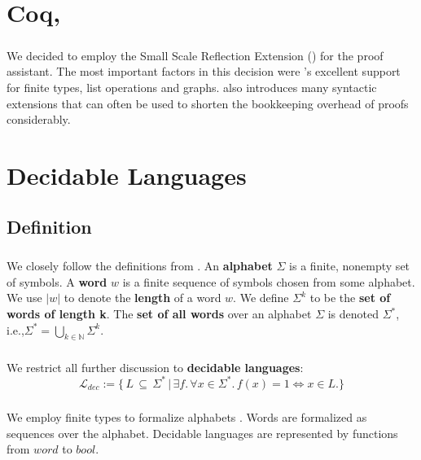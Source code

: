 \documentclass[11pt,a4paper,oneside]{book}
\begin{document}
    \chapter{Coq, \ssreflect}

        \paragraph{}
            We decided to employ the Small Scale Reflection Extension (\textbf{\ssreflect}) for the \textbf{\coq} proof assistant. 
            The most important factors in this decision were \ssreflect's excellent support for finite types, list operations and graphs. \ssreflect{} also introduces many syntactic extensions that can often be used to shorten the bookkeeping overhead of proofs considerably.

    \chapter{Decidable Languages}

    \section{Definition}
        \paragraph{}
        We closely follow the definitions from \cite{DBLP:books/daglib/0011126}.
        An \textbf{alphabet} $\Sigma$ is a finite, nonempty set of symbols. 
        A \textbf{word} $w$ is a finite sequence of symbols chosen from some alphabet. 
        We use $|w|$ to denote the \textbf{length} of a word $w$. 
        We define $\Sigma^k$ to be the \textbf{set of words of length k}.
        The \textbf{set of all words} over an alphabet $\Sigma$ is denoted $\Sigma^*$, i.e.,$\Sigma^* = \bigcup_{k \in \mathbb{N}} \Sigma^k$.
        
        \paragraph{} We restrict all further discussion to \textbf{decidable languages}:
        \[
            \mathcal{L}_{dec} := \{ \, L \, \subseteq \, \Sigma^* \, 
                \vert \, \exists f. \, \forall x \in \Sigma^*. \, f(x) = 1 \Leftrightarrow  x \in L. \}
        \] 

        \paragraph{} 
            We employ finite types to formalize alphabets . 
            Words are formalized as sequences over the alphabet.
            Decidable languages are represented by functions from $word$ to $bool$.
\end{document}
